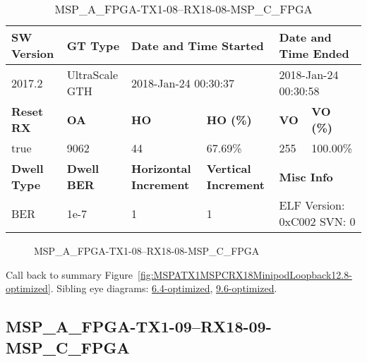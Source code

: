 \begin{table}[h]
\centering
\caption{MSP\_A\_FPGA-TX1-08--RX18-08-MSP\_C\_FPGA}
\label{tab:MSPAFPGATX108RX1808MSPCFPGA12.8-optimized}
\begin{tabular}{@{}|l|l|l|l|l|l|@{}}
\toprule
\textbf{SW Version}                & \textbf{GT Type}   & \multicolumn{2}{l|}{\textbf{Date and Time Started}}            & \multicolumn{2}{l|}{\textbf{Date and Time Ended}}        \\ \midrule
2017.2                       & UltraScale GTH          & \multicolumn{2}{l|}{2018-Jan-24 00:30:37}                   & \multicolumn{2}{l|}{2018-Jan-24 00:30:58}               \\ \midrule
\textbf{Reset RX}                  & \textbf{OA} & \textbf{HO}   & \textbf{HO (\%)} & \textbf{VO} & \textbf{VO (\%)} \\ \midrule
true & 9062        & 44          & 67.69\%        & 255        & 100.00\%       \\ \midrule
\textbf{Dwell Type}                & \textbf{Dwell BER} & \textbf{Horizontal Increment} & \textbf{Vertical Increment}    & \multicolumn{2}{l|}{\textbf{Misc Info}}                  \\ \midrule
BER                            & 1e-7        & 1        & 1           & \multicolumn{2}{l|}{ELF Version: 0xC002 SVN: 0}                         \\ \bottomrule
\end{tabular}
\end{table}

\begin{figure}[h]
\caption{MSP\_A\_FPGA-TX1-08--RX18-08-MSP\_C\_FPGA} \label{fig:MSPAFPGATX108RX1808MSPCFPGA12.8-optimized}
\end{figure}

Call back to summary Figure~\ref{fig:MSPATX1MSPCRX18MinipodLoopback12.8-optimized}.
Sibling eye diagrams: \hyperref[sec:MSPAFPGATX108RX1808MSPCFPGA6.4-optimized]{6.4-optimized}, \hyperref[sec:MSPAFPGATX108RX1808MSPCFPGA9.6-optimized]{9.6-optimized}.

\clearpage
\newpage


\subsection{MSP\_A\_FPGA-TX1-09--RX18-09-MSP\_C\_FPGA}\label{sec:MSPAFPGATX109RX1809MSPCFPGA12.8-optimized}


